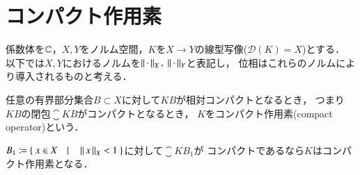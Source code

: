 \chapter{コンパクト作用素}
	係数体を$\mathbb{C}$，$X,Y$をノルム空間，$K$を$X \rightarrow Y$の線型写像($\mathscr{D}(K) = X$)とする．
	以下では$X,Y$におけるノルムを$\left\|\, \cdot\, \right\|_{X},\ \left\|\, \cdot\, \right\|_{Y}$と表記し，
	位相はこれらのノルムにより導入されるものと考える．
	
	\begin{itembox}[l]{}
		\begin{dfn}[コンパクト作用素]
			任意の有界部分集合$B \subset X$に対して$KB$が相対コンパクトとなるとき，
			つまり$KB$の閉包$\closure{KB}$がコンパクトとなるとき，
			$K$をコンパクト作用素(compact operator)という．
		\end{dfn}
	\end{itembox}
	
	\begin{itembox}[l]{}
		\begin{lem}[コンパクト作用素となるための十分条件の一つ]
			$B_1 \coloneqq \left\{\ x \in X\quad |\quad \Norm{x}{X} < 1\ \right\}$に対して$\closure{KB_1}$が
			コンパクトであるなら$K$はコンパクト作用素となる．
		\end{lem}
	\end{itembox}
	
